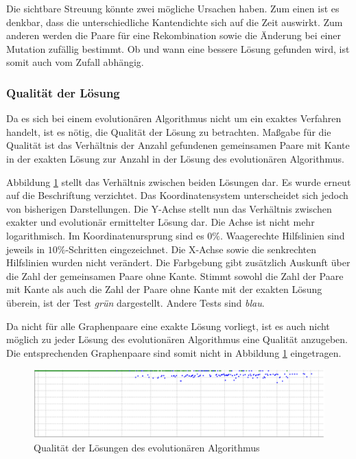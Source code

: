 Die sichtbare Streuung könnte zwei mögliche Ursachen haben. Zum einen ist es denkbar, 
dass die unterschiedliche Kantendichte sich auf die Zeit auswirkt. Zum anderen 
werden die Paare für eine Rekombination sowie die Änderung bei einer Mutation zufällig 
bestimmt. Ob und wann eine bessere Lösung gefunden wird, ist somit auch vom Zufall 
abhängig. 

\subsubsection{Qualität der Lösung}
Da es sich bei einem evolutionären Algorithmus nicht um ein exaktes Verfahren handelt, 
ist es nötig, die Qualität der Lösung zu betrachten. Maßgabe für die Qualität ist das  
Verhältnis der Anzahl gefundenen gemeinsamen Paare mit Kante in der exakten Lösung zur Anzahl 
in der Lösung des evolutionären Algorithmus. 

Abbildung \ref{pic:EvoQuali} stellt das Verhältnis zwischen beiden Lösungen dar. Es wurde erneut  
auf die Beschriftung verzichtet. Das Koordinatensystem unterscheidet sich jedoch von bisherigen 
Darstellungen. Die Y-Achse stellt nun das Verhältnis zwischen exakter und evolutionär ermittelter 
Lösung dar. Die Achse ist nicht mehr logarithmisch. Im Koordinatenursprung sind es $0\%$. 
Waagerechte Hilfslinien sind jeweils in $10\%$-Schritten eingezeichnet. Die X-Achse sowie die 
senkrechten Hilfslinien wurden nicht verändert. Die Farbgebung gibt zusätzlich Auskunft über die 
Zahl der gemeinsamen Paare ohne Kante. Stimmt sowohl die Zahl der Paare mit Kante als auch die 
Zahl der Paare ohne Kante mit der exakten Lösung überein, ist der Test \emph{grün} dargestellt. 
Andere Tests sind \emph{blau}. 

Da nicht für alle Graphenpaare eine exakte Lösung vorliegt, ist es auch nicht möglich zu 
jeder Lösung des evolutionären Algorithmus eine Qualität anzugeben. Die entsprechenden 
Graphenpaare sind somit nicht in Abbildung \ref{pic:EvoQuali} eingetragen. 

\begin{figure}[htb]
\centering
\includegraphics[width=\linewidth,height=\textheight,
keepaspectratio]{bilder/evoQuali}
\caption{Qualität der Lösungen des evolutionären Algorithmus}
\label{pic:EvoQuali}
\end{figure}

